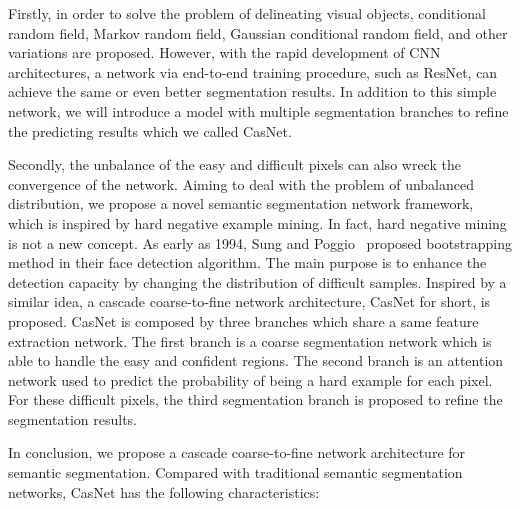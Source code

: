 \documentclass[10.5pt,compsoc]{TsT}
\newcommand{\upcite}[1]{\superscript{\textsuperscript{\cite{#1}}}}
\theoremstyle{mystyle}
\newcommand{\upcite}[1]{\textsuperscript{\cite{#1}}}
\begin{document}
{Firstly, in order to solve the problem of delineating visual objects, conditional random field, Markov random field, Gaussian conditional random field, and other variations are proposed. However, with the rapid development of CNN architectures, a network via end-to-end training procedure, such as ResNet\upcite{1}, can achieve the same or even better segmentation results. In addition to this simple network, we will introduce a model with multiple segmentation branches to refine the predicting results which we called CasNet.

Secondly, the unbalance of the easy and difficult pixels can also wreck the convergence of the network. Aiming to deal with the problem of unbalanced distribution, we propose a novel semantic segmentation network framework, which is inspired by hard negative example mining. In fact, hard negative mining is not a new concept. As early as 1994, Sung and Poggio~\upcite{5} proposed bootstrapping method in their face detection algorithm. The main purpose is to enhance the detection capacity by changing the distribution of difficult samples. Inspired by a similar idea, a cascade coarse-to-fine network architecture, CasNet for short, is proposed. CasNet is composed by three branches which share a same feature extraction network. The first branch is a coarse segmentation network which is able to handle the easy and confident regions. The second branch is an attention network used to predict the probability of being a hard example for each pixel. For these difficult pixels, the third segmentation branch is proposed to refine the segmentation results. 

In conclusion, we propose a cascade coarse-to-fine network architecture for semantic segmentation. Compared with  traditional semantic segmentation networks, CasNet has the following characteristics: 


}
\end{document}
